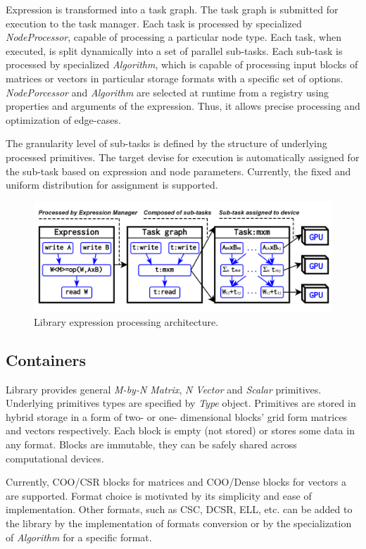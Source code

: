 Expression is transformed into a task graph. 
The task graph is submitted for execution to the task manager. 
Each task is processed by specialized \textit{NodeProcessor}, capable of processing a particular node type.
Each task, when executed, is split dynamically into a set of parallel sub-tasks. 
Each sub-task is processed by specialized \textit{Algorithm}, which is capable of processing input blocks of matrices or vectors in particular storage formats with a specific set of options. \textit{NodePorcessor} and \textit{Algorithm} are selected at runtime from a registry using properties and arguments of the expression. 
Thus, it allows precise processing and optimization of edge-cases.

The granularity level of sub-tasks is defined by the structure of underlying processed primitives. 
The target devise for execution is automatically assigned for the sub-task based on expression and node parameters. 
Currently, the fixed and uniform distribution for assignment is supported.

\begin{figure}[t]
\includegraphics[width=0.99\linewidth]{figures/library_architecture.png}
\caption{Library expression processing architecture.}
\label{fig:architecture}
\end{figure}
    
\subsection{Containers}

Library provides general \textit{M-by-N Matrix}, \textit{N Vector} and \textit{Scalar} primitives.
Underlying primitives types are specified by \textit{Type} object. 
Primitives are stored in hybrid storage in a form of two- or one- dimensional blocks' grid form matrices and vectors respectively. 
Each block is empty (not stored) or stores some data in any format. Blocks are immutable, they can be safely shared across computational devices.

Currently, COO/CSR blocks for matrices and COO/Dense blocks for vectors a are supported. Format choice is motivated by its simplicity and ease of implementation. 
Other formats, such as CSC, DCSR, ELL, etc. can be added to the library by the implementation of formats conversion or by the specialization of \textit{Algorithm} for a specific format.

